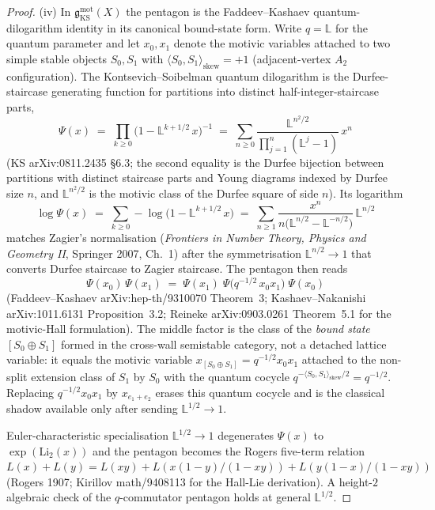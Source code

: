 \begin{proof}
(iv) In $\mathfrak{g}_{\mathrm{KS}}^{\mathrm{mot}}(X)$ the pentagon
is the Faddeev--Kashaev quantum-dilogarithm identity in its canonical
bound-state form. Write $q = \mathbb{L}$ for the quantum parameter and
let $x_0, x_1$ denote the motivic variables attached to two simple
stable objects $S_0, S_1$ with $\langle S_0, S_1\rangle_{\mathrm{skew}}
= +1$ (adjacent-vertex $A_2$ configuration). The Kontsevich--Soibelman
quantum dilogarithm is the Durfee-staircase generating function for
partitions into distinct half-integer-staircase parts,
\[
 \Psi(x)
 \;=\; \prod_{k \geq 0}
 \bigl(1 - \mathbb{L}^{k + 1/2}\, x\bigr)^{-1}
 \;=\; \sum_{n \geq 0}
 \frac{\mathbb{L}^{n^{2}/2}}{\prod_{j=1}^{n}(\mathbb{L}^{j} - 1)}
 \, x^{n}
\]
(KS \textup{arXiv:0811.2435} \S6.3; the second equality is the Durfee
bijection between partitions with distinct staircase parts and Young
diagrams indexed by Durfee size $n$, and $\mathbb{L}^{n^{2}/2}$ is the
motivic class of the Durfee square of side $n$). Its logarithm
\[
 \log \Psi(x)
 \;=\; \sum_{k \geq 0} -\log\bigl(1 - \mathbb{L}^{k + 1/2}\, x\bigr)
 \;=\; \sum_{n \geq 1}
 \frac{x^{n}}{n\bigl(\mathbb{L}^{n/2} - \mathbb{L}^{-n/2}\bigr)}
 \,\mathbb{L}^{n/2}
\]
matches Zagier's normalisation (\textit{Frontiers in Number Theory,
Physics and Geometry II}, Springer 2007, Ch.~1) after the
symmetrisation $\mathbb{L}^{n/2} \to 1$ that converts Durfee staircase
to Zagier staircase. The pentagon then reads
\[
 \Psi(x_0)\,\Psi(x_1)
 \;=\;
 \Psi(x_1)\;\Psi\!\bigl(q^{-1/2}\,x_0 x_1\bigr)\;\Psi(x_0)
\]
(Faddeev--Kashaev \textup{arXiv:hep-th/9310070} Theorem~3;
Kashaev--Nakanishi \textup{arXiv:1011.6131} Proposition~3.2;
Reineke \textup{arXiv:0903.0261} Theorem~5.1 for the motivic-Hall
formulation). The middle factor is the class of the \emph{bound
state} $[S_0 \oplus S_1]$ formed in the cross-wall semistable
category, not a detached lattice variable: it equals the motivic
variable $x_{[S_0 \oplus S_1]} = q^{-1/2} x_0 x_1$ attached to the
non-split extension class of $S_1$ by $S_0$ with the quantum cocycle
$q^{-\langle S_0, S_1\rangle_{\mathrm{skew}}/2} = q^{-1/2}$. Replacing
$q^{-1/2} x_0 x_1$ by $x_{e_1 + e_2}$ erases this quantum cocycle and
is the classical shadow available only after sending
$\mathbb{L}^{1/2} \to 1$.

Euler-characteristic specialisation $\mathbb{L}^{1/2} \to 1$
degenerates $\Psi(x)$ to $\exp(\mathrm{Li}_2(x))$ and the pentagon
becomes the Rogers five-term relation
$L(x) + L(y) = L(xy) + L(x(1-y)/(1-xy)) + L(y(1-x)/(1-xy))$
(Rogers 1907; Kirillov \textup{math/9408113} for the Hall-Lie
derivation). A height-$2$ algebraic check of the $q$-commutator
pentagon holds at general $\mathbb{L}^{1/2}$.
\end{proof}

